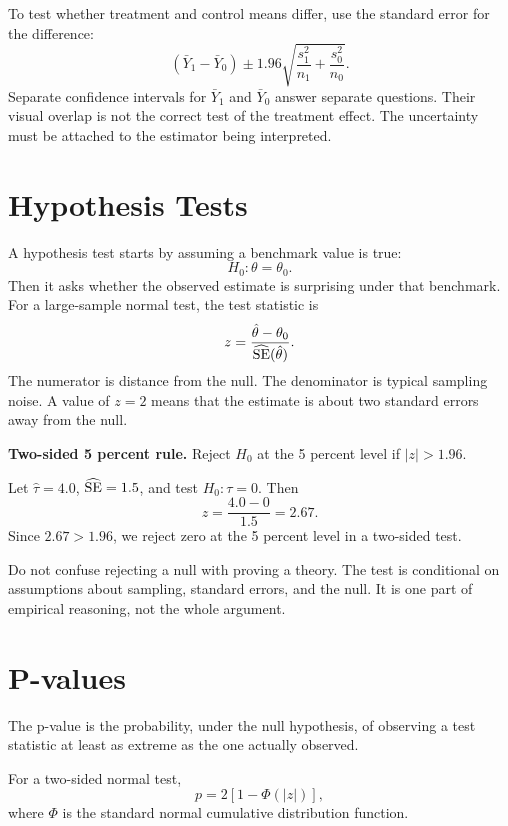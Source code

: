 To test whether treatment and control means differ, use the standard error for
the difference:
\[
  (\bar{Y}_1-\bar{Y}_0)
  \pm
  1.96
  \sqrt{
    \frac{s_1^2}{n_1}
    +
    \frac{s_0^2}{n_0}
  }.
\]
Separate confidence intervals for $\bar{Y}_1$ and $\bar{Y}_0$ answer separate
questions. Their visual overlap is not the correct test of the treatment
effect. The uncertainty must be attached to the estimator being interpreted.

\section{Hypothesis Tests}

A hypothesis test starts by assuming a benchmark value is true:
\[
  H_0:\theta=\theta_0.
\]
Then it asks whether the observed estimate is surprising under that benchmark.
For a large-sample normal test, the test statistic is
\[
  z=
  \frac{\hat{\theta}-\theta_0}
       {\widehat{\mathrm{SE}}(\hat{\theta})}.
\]
The numerator is distance from the null. The denominator is typical sampling
noise. A value of $z=2$ means that the estimate is about two standard errors
away from the null.

\begin{boxD}
\textbf{Two-sided 5 percent rule.} Reject $H_0$ at the 5 percent level if
$|z|>1.96$.
\end{boxD}

\begin{exmp}
Let $\hat{\tau}=4.0$, $\widehat{\mathrm{SE}}=1.5$, and test $H_0:\tau=0$. Then
\[
  z=\frac{4.0-0}{1.5}=2.67.
\]
Since $2.67>1.96$, we reject zero at the 5 percent level in a two-sided test.
\end{exmp}

Do not confuse rejecting a null with proving a theory. The test is conditional
on assumptions about sampling, standard errors, and the null. It is one part
of empirical reasoning, not the whole argument.

\section{P-values}

\begin{defN}[P-value]
The p-value is the probability, under the null hypothesis, of observing a test
statistic at least as extreme as the one actually observed.
\end{defN}

For a two-sided normal test,
\[
  p = 2[1-\Phi(|z|)],
\]
where $\Phi$ is the standard normal cumulative distribution function.

